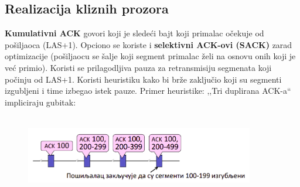 \documentclass[a4paper]{article}
\begin{document}
    \subsection{Realizacija kliznih prozora}
        \textbf{Kumulativni ACK} govori koji je sledeći bajt koji primalac očekuje od pošiljaoca
        (LAS+1). Opciono se koriste i \textbf{selektivni ACK-ovi (SACK)} zarad optimizacije 
        (pošiljaocu se šalje koji segment primalac želi na osnovu onih koji je već primio). Koristi
        se prilagodljiva pauza za retransmisiju segmenata koji počinju od LAS+1. Koristi heuristiku
        kako bi brže zaključio koji su segmenti izgubljeni i time izbegao istek pauze. Primer
        heuristike: ,,Tri duplirana ACK-a`` impliciraju gubitak:
        \begin{figure}[H]
            \begin{center}
                \includegraphics[width=100mm,height=35mm]{Slike/tcp_heuristika.png}
            \end{center}
        \end{figure}
\end{document}
